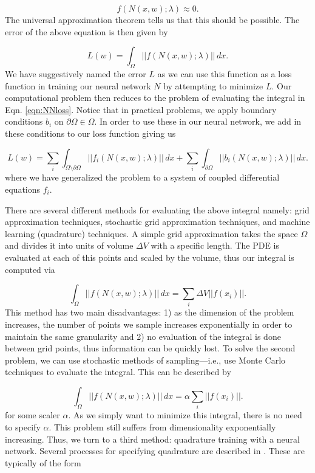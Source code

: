 \documentclass{CUP-JNL-DTM}%
\theoremstyle{definition}
\numberwithin{equation}{section}
\begin{document}
\begin{equation}
	f(N(x, w); \lambda) \approx 0.
	\label{eqn:NNapprox}
\end{equation}
The universal approximation theorem tells us that this should be possible. The error of the above equation is then given by 

\begin{equation}
	L(w) = \int_{\Omega} ||f(N(x,w); \lambda)||\,dx. 
	\label{eqn:NNloss}
\end{equation}
We have suggestively named the error $L$ as we can use this function as a loss function in training our neural network $N$ by attempting to minimize $L$. Our computational problem then reduces to the problem of evaluating the integral in Eqn. \ref{eqn:NNloss}. Notice that in practical problems, we apply boundary conditions $b_i$ on $\partial \Omega \in \Omega$. In order to use these in our neural network, we add in these conditions to our loss function giving us 

\begin{equation}
	L(w) = \sum_i\int_{\Omega\setminus\partial\Omega} ||f_i(N(x,w); \lambda)||\,dx + \sum_i\int_{\partial\Omega} ||b_i(N(x,w); \lambda)||\,dx.
	\label{eqn:complete_loss} 
\end{equation}
where we have generalized the problem to a system of coupled differential equations $f_i$. 

There are several different methods for evaluating the above integral namely: grid approximation techniques, stochastic grid approximation techniques, and machine learning (quadrature) techniques. A simple grid approximation takes the space $\Omega$ and divides it into units of volume $\Delta V$ with a specific length. The PDE is evaluated at each of this points and scaled by the volume, thus our integral is computed via 

\begin{equation}
	\int_{\Omega} ||f(N(x,w); \lambda)||\,dx = \sum_i \Delta V ||f(x_i)||.
\end{equation}
This method has two main disadvantages: 1) as the dimension of the problem increases, the number of points we sample increases exponentially in order to maintain the same granularity and 2) no evaluation of the integral is done between grid points, thus information can be quickly lost. To solve the second problem, we can use stochastic methods of sampling---i.e., use Monte Carlo techniques to evaluate the integral. This can be described by 

\begin{equation}
	\int_{\Omega} ||f(N(x,w); \lambda)||\,dx = \alpha \sum_i ||f(x_i)||.
\end{equation}
for some scaler $\alpha$. As we simply want to minimize this integral, there is no need to specify $\alpha$. This problem still suffers from dimensionality exponentially increasing. Thus, we turn to a third method: quadrature training with a neural network. Several processes for specifying quadrature are described in \cite{riveraQuadratureRulesSolving2022}. These are typically of the form 
\end{document}
